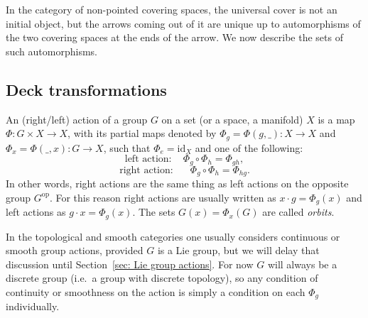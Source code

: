 In the category of non-pointed covering spaces, the universal cover is not an initial object, but the arrows coming out of it are unique up to automorphisms of the two covering spaces at the ends of the arrow. We now describe the sets of such automorphisms.

\subsection{Deck transformations}

\begin{defn}
    An (right/left) action of a group $G$ on a set (or a space, a manifold) $X$ is a map $\Phi: G\times X\to X$, with its partial maps denoted by $\Phi_g=\Phi (g,\_):X\to X$ and $\Phi_x=\Phi(\_,x):G\to X$, such that $\Phi_e=\mathrm{id}_X$ and one of the following:
    \[
        \text{left action}:\quad \Phi_g\circ \Phi_h=\Phi_{gh},\]
        \[\text{right action}: \quad \;\; \Phi_g\circ \Phi_h=\Phi_{hg}.
    \]
    In other words, right actions are the same thing as left actions on the opposite group $G^{\mathrm{op}}$. For this reason right actions are usually written as $x\cdot g=\Phi_g(x)$ and left actions as $g\cdot x=\Phi_g(x)$. The sets $G(x)=\Phi_x(G)$ are called \emph{orbits}.
\end{defn}
In the topological and smooth categories one usually considers continuous or smooth group actions, provided $G$ is a Lie group, but we will delay that discussion until Section~\ref{sec: Lie group actions}. For now $G$ will always be a discrete group (i.e.\ a group with discrete topology), so any condition of continuity or smoothness on the action is simply a condition on each $\Phi_g$ individually.

